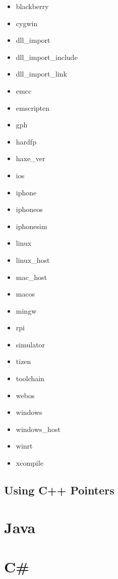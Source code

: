 \begin{itemize}
	\item blackberry
	\item cygwin
	\item dll_import
	\item dll_import_include
	\item dll_import_link
	\item emcc
	\item emscripten
	\item gph
	\item hardfp
	\item haxe_ver
	\item ios
	\item iphone
	\item iphoneos
	\item iphonesim
	\item linux
	\item linux_host
	\item mac_host
	\item macos
	\item mingw
	\item rpi
	\item simulator
	\item tizen
	\item toolchain
	\item webos
	\item windows
	\item windows_host
	\item winrt
	\item xcompile
\end{itemize}

\subsection{Using C++ Pointers}
\label{target-cpp-pointers}

\section{Java}
\label{target-java}

\section{C\#}
\label{target-cs}
